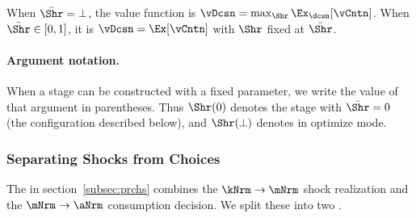 \noindent When $\bar{\Shr} = \bot$, the {\Decision} value function is $\vDcsn = \max_{\Shr} \Ex_{\dcsn}[\vCntn]$.  When $\bar{\Shr} \in [0,1]$, it is $\vDcsn = \Ex[\vCntn]$ with $\Shr$ fixed at $\bar{\Shr}$.

\hypertarget{argument-notation}{}
\paragraph{Argument notation.}  When a stage can be constructed with a fixed parameter, we write the value of that argument in parentheses.  Thus $\Shr(0)$ denotes the  stage with $\bar{\Shr}=0$ (the  configuration described below), and $\Shr(\bot)$ denotes  in optimize mode.

\hypertarget{shocks-only-decomposition}{}
\subsubsection{Separating Shocks from Choices}\label{subsubsec:shocks-cons-decomp}

The  {\stg} in section~\ref{subsec:prchs} combines the $\kNrm \to \mNrm$ shock realization and the $\mNrm \to \aNrm$ consumption decision.  We split these into two {\stgs}.

